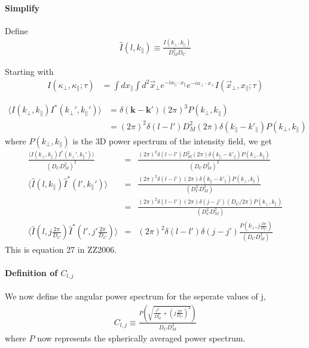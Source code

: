 \documentclass[12pt]{article}
\newcommand{\beq}{\begin{equation}}
\newcommand{\eeq}{\end{equation}}
\newcommand{\beqa}{\begin{eqnarray}}
\newcommand{\eeqa}{\end{eqnarray}}
\newcommand{\beqal}{\begin{aligned}}
\newcommand{\eeqal}{\end{aligned}}
\numberwithin{equation}{section}
\begin{document}
\paragraph{Simplify}
Define
\beqa
\hat{I} (l, k_\parallel) \equiv \frac{I(k_\perp, k_\parallel)}{D_M^2D_C}
\eeqa

Starting with
\beq
\beqal
I(\kappa_\perp,\kappa_\parallel ; \tau) &= \int dx_\parallel \int d^2\vec{x}_\perp e^{-i \kappa_\parallel \cdot x_\parallel} e^{-i \kappa_\perp \cdot x_\perp} I(\vec{x}_\perp, x_\parallel; \tau) \label{eq:foreman1}
\eeqal
\eeq

\beq
\beqal
\langle I(k_\perp, k_\parallel) I^*(k_\perp', k_\parallel')   \rangle &= \delta(\textbf{k} - \textbf{k}') (2\pi)^3 P(k_\perp, k_\parallel)
\\
&= (2\pi)^2 \delta(l - l') D_M^2 (2\pi) \delta(k_\parallel - k'_\parallel) P(k_\perp, k_\parallel) \label{eq:3dcorr}
\eeqal
\eeq
where  $ P(k_\perp, k_\parallel) $ is the 3D power spectrum of the intensity field, we get
\beqa
\frac{\langle I(k_\perp, k_\parallel) I^*(k_\perp', k_\parallel')   \rangle}{(D_C D_M^2)^2} &=& \frac{(2\pi)^2 \delta(l - l') D_M^2 (2\pi) \delta(k_\parallel - k'_\parallel) P(k_\perp, k_\parallel) }{(D_C D_M^2)^2}
\\
\langle \hat{I}(l, k_\parallel) \hat{I}^*(l', k_\parallel')   \rangle &=& \frac{(2\pi)^2 \delta(l - l')  (2\pi) \delta(k_\parallel - k'_\parallel) P(k_\perp, k_\parallel) }{(D_C^2 D_M^2)}
\\
&=& \frac{(2\pi)^2 \delta(l - l')  (2\pi) \delta(j - j') (D_C/2\pi) P(k_\perp, k_\parallel) }{(D_C^2 D_M^2)}
\\
\langle \hat{I}(l, j \frac{2\pi}{D_C}) \hat{I}^*(l', j'\frac{2\pi}{D_C})   \rangle  &=& (2\pi)^2 \delta(l - l') \delta(j - j')  \frac{P(k_\perp, j\frac{2\pi}{D_C}) }{(D_C D_M^2)}
\eeqa
This is equation 27 in ZZ2006.

\paragraph{Definition of $ C_{l,j} $}
We now define the angular power spectrum for the seperate values of j, 
\beqa
C_{l,j} \equiv \frac{P \left( \sqrt{\frac{l^2}{D_M^2} + (j\frac{2\pi}{D_C})^2} \right)}{D_C D_M^2}
\eeqa
where $ P $ now represents the spherically averaged power spectrum.
\end{document}
